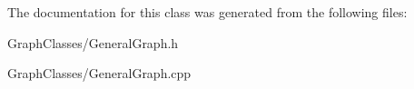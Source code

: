The documentation for this class was generated from the following files\+:\begin{DoxyCompactItemize}
\item 
Graph\+Classes/General\+Graph.\+h\item 
Graph\+Classes/General\+Graph.\+cpp\end{DoxyCompactItemize}
